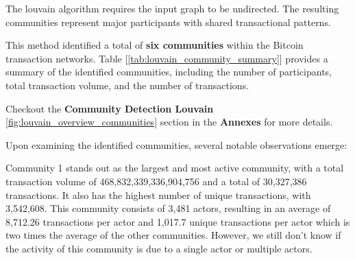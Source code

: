 \documentclass[a4paper, 12pt]{article}
\begin{document}
The louvain algorithm requires the input graph to be undirected. The resulting communities represent major participants with shared transactional patterns.

This method identified a total of \textbf{six communities} within the Bitcoin transaction networks. Table [\ref{tab:louvain_community_summary}] provides a summary of the identified communities, including the number of participants, total transaction volume, and the number of transactions.

\begin{table}[!htb]
    \centering
    \caption{Summary of Louvain Community Characteristics}
    \label{tab:louvain_community_summary}
\end{table}

Checkout the \textbf{Community Detection Louvain} \ref{fig:louvain_overview_communities} section in the \textbf{Annexes} for more details.


Upon examining the identified communities, several notable observations emerge:

Community 1 stands out as the largest and most active community, with a total transaction volume of 468,832,339,336,904,756 and a total of 30,327,386 transactions.
It also has the highest number of unique transactions, with 3,542,608. This community consists of 3,481 actors, resulting in an average of 8,712.26 transactions per actor and 1,017.7 unique transactions per actor which is two times the average of the other communities.
However, we still don't know if the activity of this community is due to a single actor or multiple actors.
\end{document}
